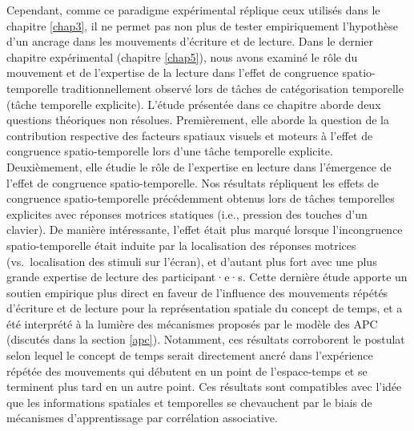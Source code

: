 \documentclass[
  a4paper,12pt,twoside,onecolumn,openright,final,oldfontcommands]{memoir}
\begin{document}
Cependant, comme ce paradigme expérimental réplique ceux utilisés dans le chapitre \ref{chap3}, il ne permet pas non plus de tester empiriquement l'hypothèse d'un ancrage dans les mouvements d'écriture et de lecture. Dans le dernier chapitre expérimental (chapitre \ref{chap5}), nous avons examiné le rôle du mouvement et de l'expertise de la lecture dans l'effet de congruence spatio-temporelle traditionnellement observé lors de tâches de catégorisation temporelle (tâche temporelle explicite). L'étude présentée dans ce chapitre aborde deux questions théoriques non résolues. Premièrement, elle aborde la question de la contribution respective des facteurs spatiaux visuels et moteurs à l'effet de congruence spatio-temporelle lors d'une tâche temporelle explicite. Deuxièmement, elle étudie le rôle de l'expertise en lecture dans l'émergence de l'effet de congruence spatio-temporelle. Nos résultats répliquent les effets de congruence spatio-temporelle précédemment obtenus lors de tâches temporelles explicites avec réponses motrices statiques (i.e., pression des touches d'un clavier). De manière intéressante, l'effet était plus marqué lorsque l'incongruence spatio-temporelle était induite par la localisation des réponses motrices (vs.~localisation des stimuli sur l'écran), et d'autant plus fort avec une plus grande expertise de lecture des participant·e·s. Cette dernière étude apporte un soutien empirique plus direct en faveur de l'influence des mouvements répétés d'écriture et de lecture pour la représentation spatiale du concept de temps, et a été interprété à la lumière des mécanismes proposés par le modèle des APC (discutés dans la section \ref{apc}). Notamment, ces résultats corroborent le postulat selon lequel le concept de temps serait directement ancré dans l'expérience répétée des mouvements qui débutent en un point de l'espace-temps et se terminent plus tard en un autre point. Ces résultats sont compatibles avec l'idée que les informations spatiales et temporelles se chevauchent par le biais de mécanismes d'apprentissage par corrélation associative.
\end{document}
